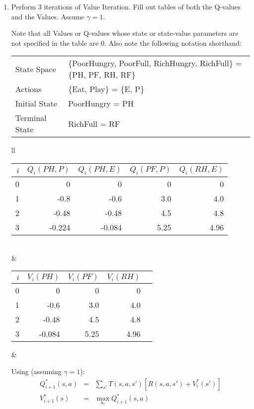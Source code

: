 \documentclass[12pt]{article}
\begin{document}
\begin{enumerate}

\item Perform 3 iterations of Value Iteration. Fill out tables of both
  the Q-values and the Values.  Assume $\gamma = 1$.

  Note that all Values or Q-values whose state or state-value parameters are not specified in the table are 0.
  Also note the following notation shorthand:
  \begin{flushleft}
  \begin{tabular}{ll}
  State Space & \{PoorHungry, PoorFull, RichHungry, RichFull\} = \{PH, PF, RH, RF\}\\
  Actions     & \{Eat, Play\} = \{E, P\}\\
  Initial State &  PoorHungry = PH\\
  Terminal State & RichFull = RF 
  \end{tabular}
  \end{flushleft}

  \begin{flushleft}
    \begin{tabular}{ll}
    \begin{tabular}{|r|r|r|r|r|} \hline
    $i$ & $Q_i(PH,P)$ & $Q_i(PH,E)$ & $Q_i(PF,P)$ & $Q_i(RH,E)$\\ \hline\hline
    0   & 0 & 0 & 0 & 0 \\ \hline
    1   & -0.8 & -0.6 & 3.0 & 4.0 \\ \hline
    2   & -0.48 & -0.48 & 4.5 & 4.8 \\ \hline
    3   & -0.224 & -0.084 & 5.25 & 4.96 \\ \hline
    \end{tabular}
    \\
     &            \\
    \begin{tabular}{|r|r|r|r|r|} \hline
    $i$ & $V_i(PH)$ & $V_i(PF)$ & $V_i(RH)$ \\ \hline\hline
    0   & 0 & 0 & 0 \\ \hline
    1   & -0.6 & 3.0 & 4.0 \\ \hline
    2   & -0.48 & 4.5 & 4.8 \\ \hline
    3   & -0.084 & 5.25 & 4.96 \\ \hline
    \end{tabular} & 
    \end{tabular}
  \end{flushleft}

  Using (assuming $\gamma = 1$):
  \begin{eqnarray*}
  Q^*_{i+1}(s,a) &=& \sum_{s'} T(s,a,s') [R(s,a,s') + V^*_i(s')] \\[.1in]
  V^*_{i+1}(s)   &=& \max_{a_i} Q^*_{i+1}(s,a)
  \end{eqnarray*}


\end{enumerate}
\end{document}
